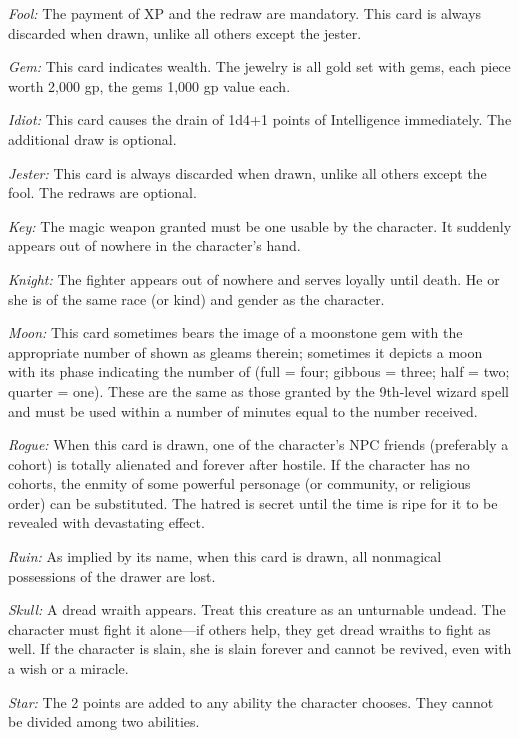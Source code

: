 \textit{Fool:} The payment of XP and the redraw are mandatory. This card is always discarded when drawn, unlike all others except the jester.

\textit{Gem:} This card indicates wealth. The jewelry is all gold set with gems, each piece worth 2,000 gp, the gems 1,000 gp value each.

\textit{Idiot:} This card causes the drain of 1d4+1 points of Intelligence immediately. The additional draw is optional.

\textit{Jester:} This card is always discarded when drawn, unlike all others except the fool. The redraws are optional.

\textit{Key:} The magic weapon granted must be one usable by the character. It suddenly appears out of nowhere in the character's hand.

\textit{Knight:} The fighter appears out of nowhere and serves loyally until death. He or she is of the same race (or kind) and gender as the character.

\textit{Moon:} This card sometimes bears the image of a moonstone gem with the appropriate number of  shown as gleams therein; sometimes it depicts a moon with its phase indicating the number of  (full = four; gibbous = three; half = two; quarter = one). These  are the same as those granted by the 9th-level wizard spell and must be used within a number of minutes equal to the number received.

\textit{Rogue:} When this card is drawn, one of the character's NPC friends (preferably a cohort) is totally alienated and forever after hostile. If the character has no cohorts, the enmity of some powerful personage (or community, or religious order) can be substituted. The hatred is secret until the time is ripe for it to be revealed with devastating effect.

\textit{Ruin:} As implied by its name, when this card is drawn, all nonmagical possessions of the drawer are lost.

\textit{Skull:} A dread wraith appears. Treat this creature as an unturnable undead. The character must fight it alone---if others help, they get dread wraiths to fight as well. If the character is slain, she is slain forever and cannot be revived, even with a wish or a miracle.

\textit{Star:} The 2 points are added to any ability the character chooses. They cannot be divided among two abilities.

